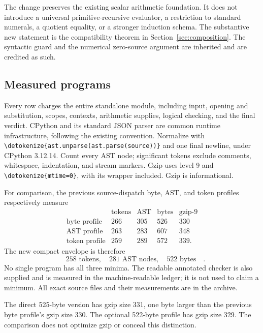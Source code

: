 \documentclass[11pt,letterpaper]{article}
\theoremstyle{definition}\newtheorem{definition}[theorem]{Definition}
\theoremstyle{remark}\newtheorem{remark}[theorem]{Remark}
\newcommand{\file}[1]{\expandafter\nolinkurl\expandafter{\detokenize{#1}}}
\begin{document}
The change preserves the existing scalar arithmetic foundation. It does
not introduce a universal primitive-recursive evaluator, a restriction to
standard numerals, a quotient equality, or a stronger induction schema.
The substantive new statement is the compatibility theorem in
Section~\ref{sec:composition}. The syntactic guard and the numerical
zero-source argument are inherited and are credited as such.

\subsection{Measured programs}

Every row charges the entire standalone module, including input, opening
and substitution, scopes, contexts, arithmetic supplies, logical checking,
and the final verdict. CPython and its standard JSON parser are common
runtime infrastructure, following the existing convention. Normalize with
\file{ast.unparse(ast.parse(source))} and one final newline, under CPython
3.12.14. Count every AST node; significant tokens exclude comments,
whitespace, indentation, and stream markers. Gzip uses level 9 and
\file{mtime=0}, with its wrapper included. Gzip is informational.

\begin{center}\small

\end{center}

For comparison, the previous source-dispatch byte, AST, and token profiles
respectively measure
\[
\begin{array}{c|rrrr}
 &\text{tokens}&\text{AST}&\text{bytes}&\text{gzip-9}\\\hline
\text{byte profile}&266&305&526&330\\
\text{AST profile}&263&283&607&348\\
\text{token profile}&259&289&572&339.
\end{array}
\]
The new compact envelope is therefore
\[
\boxed{\quad258\text{ tokens},\quad281\text{ AST nodes},\quad522\text{ bytes}\quad}.
\]
No single program has all three minima. The readable annotated checker is
also supplied and is measured in the machine-readable ledger; it is not
used to claim a minimum. All exact source files and their measurements are
in the archive.

The direct 525-byte version has gzip size 331, one byte larger than the
previous byte profile's gzip size 330. The optional 522-byte profile has
gzip size 329. The comparison does not optimize gzip or conceal this
distinction.
\end{document}
